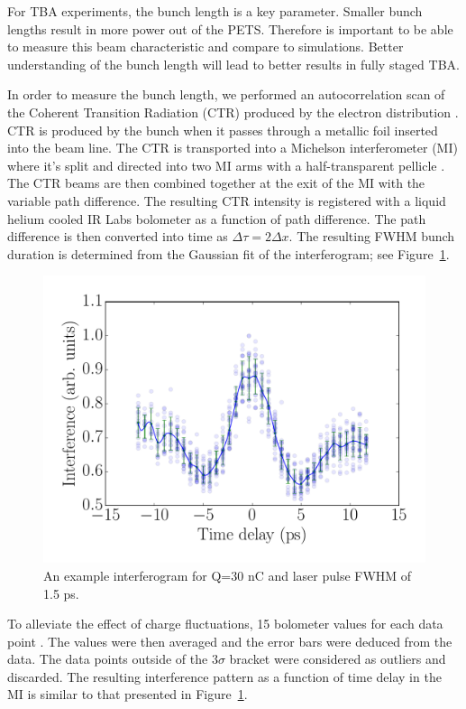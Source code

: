 \label{sec:bunchlength}

For TBA experiments, the bunch length is a key parameter.
Smaller bunch lengths result in more power out of the PETS. 
Therefore is important to be able to measure this beam characteristic 
and compare to simulations. Better understanding of the bunch length
will lead to better results in fully staged TBA.

In order to measure the bunch length, we performed an autocorrelation scan
of the Coherent Transition Radiation (CTR) produced by the electron distribution \cite{Happek, WBarry}.
CTR is produced by the bunch when it passes through a metallic foil inserted into the beam line. 
The CTR is transported into a Michelson interferometer (MI)
where it's split and directed into two MI arms with a half-transparent pellicle \cite{PhysRevSTAB.9.082801}. 
The CTR beams are then combined together at the exit of the MI with the variable path difference.
The resulting CTR intensity is registered with a liquid helium cooled IR Labs
bolometer \cite{IRlabs} as a function of path difference.
The path difference is then converted into time as $\Delta \tau = 2 \Delta x$.
The resulting FWHM bunch duration is determined from the Gaussian fit of 
the interferogram; see Figure~\ref{interferogram}.
\begin{figure}
	\centering
	\includegraphics[width=0.75\linewidth]{images/THPMF048f1}
	\caption{An example interferogram for Q=30 nC and laser pulse FWHM of 1.5 ps.}
	\label{interferogram}
\end{figure}
To alleviate the effect of charge fluctuations,  15 bolometer values for each data point .
The values were then averaged and the error bars were deduced from the data. The data points
outside of the 3$\sigma$ bracket were considered as outliers and discarded. The resulting
interference pattern as a function of time delay in the MI is similar to that presented in Figure~\ref{interferogram}.

